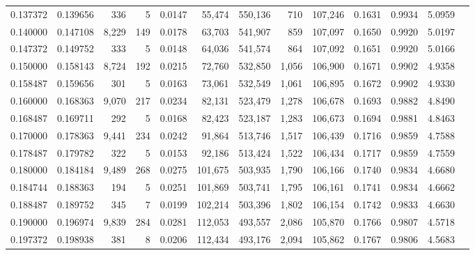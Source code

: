 \begin{tabular}{rrrrrrrrrrrrr}
0.137372 & 0.139656 &    336 &     5 &                                     0.0147 &  55,474 & 550,136 &     710 & 107,246 & 0.1631 & 0.9934 & 5.0959 \\
0.140000 & 0.147108 &  8,229 &   149 &                                     0.0178 &  63,703 & 541,907 &     859 & 107,097 & 0.1650 & 0.9920 & 5.0197 \\
0.147372 & 0.149752 &    333 &     5 &                                     0.0148 &  64,036 & 541,574 &     864 & 107,092 & 0.1651 & 0.9920 & 5.0166 \\
0.150000 & 0.158143 &  8,724 &   192 &                                     0.0215 &  72,760 & 532,850 &   1,056 & 106,900 & 0.1671 & 0.9902 & 4.9358 \\
0.158487 & 0.159656 &    301 &     5 &                                     0.0163 &  73,061 & 532,549 &   1,061 & 106,895 & 0.1672 & 0.9902 & 4.9330 \\
0.160000 & 0.168363 &  9,070 &   217 &                                     0.0234 &  82,131 & 523,479 &   1,278 & 106,678 & 0.1693 & 0.9882 & 4.8490 \\
0.168487 & 0.169711 &    292 &     5 &                                     0.0168 &  82,423 & 523,187 &   1,283 & 106,673 & 0.1694 & 0.9881 & 4.8463 \\
0.170000 & 0.178363 &  9,441 &   234 &                                     0.0242 &  91,864 & 513,746 &   1,517 & 106,439 & 0.1716 & 0.9859 & 4.7588 \\
0.178487 & 0.179782 &    322 &     5 &                                     0.0153 &  92,186 & 513,424 &   1,522 & 106,434 & 0.1717 & 0.9859 & 4.7559 \\
0.180000 & 0.184184 &  9,489 &   268 &                                     0.0275 & 101,675 & 503,935 &   1,790 & 106,166 & 0.1740 & 0.9834 & 4.6680 \\
0.184744 & 0.188363 &    194 &     5 &                                     0.0251 & 101,869 & 503,741 &   1,795 & 106,161 & 0.1741 & 0.9834 & 4.6662 \\
0.188487 & 0.189752 &    345 &     7 &                                     0.0199 & 102,214 & 503,396 &   1,802 & 106,154 & 0.1742 & 0.9833 & 4.6630 \\
0.190000 & 0.196974 &  9,839 &   284 &                                     0.0281 & 112,053 & 493,557 &   2,086 & 105,870 & 0.1766 & 0.9807 & 4.5718 \\
0.197372 & 0.198938 &    381 &     8 &                                     0.0206 & 112,434 & 493,176 &   2,094 & 105,862 & 0.1767 & 0.9806 & 4.5683 \\

\end{tabular}
